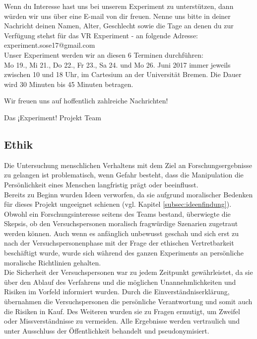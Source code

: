 \documentclass{Bericht}
\begin{document}
Wenn du Interesse hast uns bei unserem Experiment zu unterstützen, dann würden wir uns über eine E-mail von dir freuen. Nenne uns bitte in deiner Nachricht deinen Namen, Alter, Geschlecht sowie die Tage an denen du zur Verfügung stehst für das VR Experiment - an folgende Adresse: experiment.sose17@gmail.com \\

Unser Experiment werden wir an diesen 6 Terminen durchführen: \\

Mo 19., Mi 21., Do 22., Fr 23., Sa 24. und Mo 26. Juni 2017 immer jeweils zwischen 10 und 18 Uhr, im Cartesium an der Universität Bremen. Die Dauer wird 30 Minuten bis 45 Minuten betragen.

Wir freuen uns auf hoffentlich zahlreiche Nachrichten!

Das ¡Experiment! Projekt Team
\par 
\endgroup


\subsection{Ethik}
Die Untersuchung menschlichen Verhaltens mit dem Ziel an Forschungsergebnisse zu gelangen ist problematisch, wenn Gefahr besteht, dass die Manipulation die Persönlichkeit eines Menschen langfristig prägt oder beeinflusst.\\
 Bereits zu Beginn wurden Ideen verworfen, da sie aufgrund moralischer Bedenken für dieses Projekt ungeeignet schienen (vgl. Kapitel \ref{subsec:ideenfindung}). Obwohl ein Forschungsinteresse seitens des Teams bestand, überwiegte die Skepsis, ob den Versuchspersonen moralisch fragwürdige Szenarien zugetraut werden können. Auch wenn es anfänglich unbewusst geschah und sich erst zu nach der Versuchspersonenphase mit der Frage der ethischen Vertretbarkeit beschäftigt wurde, wurde sich während des ganzen Experiments an persönliche moralische Richtlinien gehalten. \\
Die Sicherheit der Versuchspersonen war zu jedem Zeitpunkt gewährleistet, da sie über den Ablauf des Verfahrens und die möglichen Unannehmlichkeiten und Risiken im Vorfeld informiert wurden. Durch die Einverständniserklärung, übernahmen die Versuchspersonen die persönliche Verantwortung und somit auch die Risiken in Kauf. Des Weiteren wurden sie zu Fragen ermutigt, um Zweifel oder Missverständnisse zu vermeiden. Alle Ergebnisse werden vertraulich und unter Ausschluss der Öffentlichkeit behandelt und pseudonymisiert.
\end{document}
